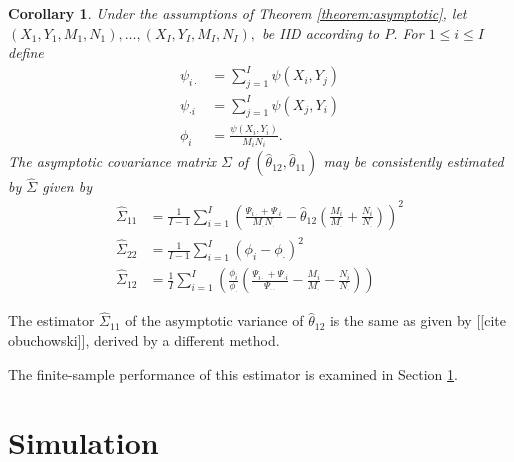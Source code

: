 \message{ !name(manuscript.tex)}\documentclass[12pt]{article}
\DeclareMathOperator{\AUC}{AUC}
\newcommand{\I}{I}
\renewcommand{\P}{P}
\newcommand{\cind}{\perp \!\!\! \perp}
\newcommand{\aucindivhat}{\hat{\theta}_{11}}%
\newcommand{\aucpophat}{\hat{\theta}_{12}}%
\newcommand{\kernel}{\psi}
\newcommand{\Kernel}{\Psi}
\renewcommand{\d}{\phi}
\newtheorem{corollary}[theorem]{Corollary}
\begin{document}
\begin{corollary}
  Under the assumptions of Theorem \ref{theorem:asymptotic}, let
  $(X_1,Y_1,M_1,N_1),\ldots,(X_\I,Y_\I,M_\I,N_\I),$ be IID according
  to $\P$. For $1\le i\le \I$ define
  \begin{align}
    \kernel_{i\cdot}&=\sum_{j=1}^\I \kernel(X_i,Y_j)\\
    \kernel_{\cdot i}&=\sum_{j=1}^\I \kernel(X_j,Y_i)\\
    \phi_i &= \frac{\kernel(X_i,Y_i)}{M_iN_i}.
  \end{align}
  The asymptotic covariance matrix
  $\Sigma$ of $(\aucpophat,\aucindivhat)$ may be consistently
  estimated by $\hat{\Sigma}$ given by
  \begin{align}
    \hat{\Sigma}_{11} &=\frac{1}{\I-1}\sum_{i=1}^\I\left( \frac{\Kernel_{i\cdot}+\Kernel_{\cdot i}}{M_\cdot N_\cdot}-\aucpophat\left(\frac{M_i}{M_\cdot}+\frac{N_i}{N_\cdot}\right) \right)^2\\
    \hat{\Sigma}_{22} &= \frac{1}{\I-1}\sum_{i=1}^\I(\d_i-\d_\cdot)^2\\
    \hat{\Sigma}_{12} &=\frac{1}{\I}\sum_{i=1}^\I\left(\frac{\d_{i}}{\d_{\cdot}}\left(\frac{\Kernel_{i\cdot}+\Kernel_{\cdot i}}{\Kernel_{\cdot\cdot}} - \frac{M_i}{M_\cdot}-\frac{N_i}{N_\cdot}   \right) \right) %
  \end{align}
\end{corollary}

The estimator $\hat{\Sigma}_{11}$ of the asymptotic variance of $\aucpophat$ is the same as given by [[cite obuchowski]], derived by a different method.

The finite-sample performance of this estimator is examined in Section \ref{section:simulation}.



\section{Simulation}\label{section:simulation}
\end{document}
